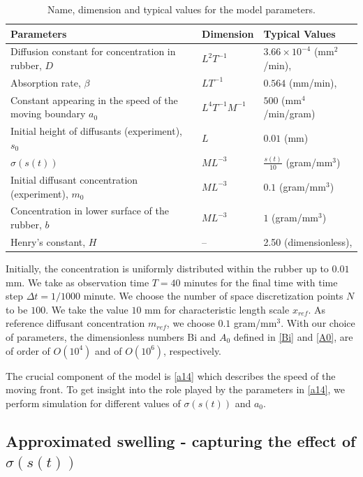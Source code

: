 \documentclass{article}
\begin{document}
\begin {table}[h]
\begin{center}
	\begin{tabular}{ |p{9.2cm}|p{1.7cm}|p{4.3cm}| }
		\hline
		Parameters & Dimension&Typical Values\\
		\hline
		Diffusion constant for concentration in rubber, $D$ &$L^2T^{-1}$& $3.66 \times 10^{-4}$ (mm$^2$/min), \cite{morton2013rubber} \\
		Absorption rate,  $\beta$ &$ LT^{-1}$ & $0.564$ (mm/min), \cite{rezk2018determination}\\
		Constant appearing in the speed of the moving boundary $a_0$&$L^4 T^{-1} M^{-1}$& $500$ (mm$^4$/min/gram) \\
		Initial height of diffusants (experiment),  $s_0$ & $L$ & $0.01$ (mm)\\
		$\sigma(s(t))$& $ML^{-3}$& $\frac{s(t)}{10}$ (gram/mm$^3$)\\
		Initial diffusant concentration (experiment), $m_0$ & $ML^{-3}$& $0.1$ (gram/mm$^3$)\\
		Concentration in lower surface of the rubber, $b$& $ML^{-3}$&$1$ (gram/mm$^3$) \\
		Henry's constant, 	$H$& --& 2.50 (dimensionless),  \cite{bohm1998moving}\\
		\hline
	\end{tabular}
	\caption {Name,  dimension and typical values for the model  parameters.}
	\label{parameter} 
\end{center}
\end {table}
Initially, the concentration is uniformly distributed within the rubber up to $0.01$ mm.  We take as observation time $T = 40$ minutes for the final time with time step $\Delta t = 1/1000$ minute. We choose the number of space discretization points $N$ to be $100$.  We take  the value $10$ mm  for characteristic length  scale  $x_{ref}$. As reference diffusant  concentration $m_{ref}$, we choose $0.1$ gram/mm$^3$. With our choice of parameters, the dimensionless numbers Bi and $A_0$ defined in \eqref{Bi} and \eqref{A0}, are of order of $O(10^4)$ and of  $O(10^6)$, respectively.

The  crucial component of the model is \eqref{a14} which describes the speed of the moving front. To get insight into  the role played by the parameters in  \eqref{a14}, we perform simulation for different values of $\sigma(s(t))$ and $a_0$. 

\subsection{Approximated swelling - capturing the effect of $\sigma(s(t))$}
\end{document}
